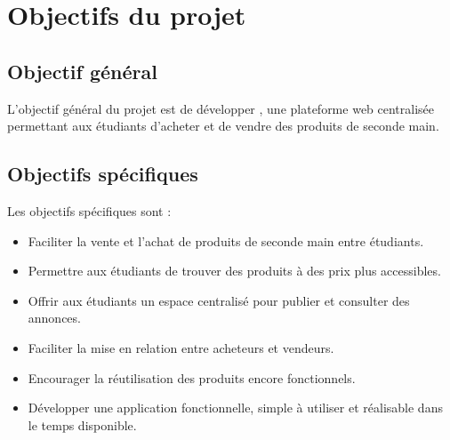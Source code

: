 ﻿\chapter{Objectifs du projet}

\section{Objectif général}

L'objectif général du projet est de développer \nomProjet, une plateforme web centralisée permettant aux étudiants d'acheter et de vendre des produits de seconde main.

\section{Objectifs spécifiques}

Les objectifs spécifiques sont :

\begin{itemize}
  \item Faciliter la vente et l'achat de produits de seconde main entre étudiants.
  \item Permettre aux étudiants de trouver des produits à des prix plus accessibles.
  \item Offrir aux étudiants un espace centralisé pour publier et consulter des annonces.
  \item Faciliter la mise en relation entre acheteurs et vendeurs.
  \item Encourager la réutilisation des produits encore fonctionnels.
  \item Développer une application fonctionnelle, simple à utiliser et réalisable dans le temps disponible.
\end{itemize}
